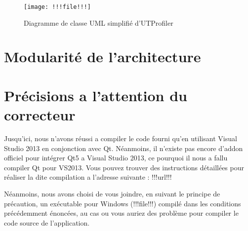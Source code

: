 \documentclass[a4paper,11pt]{article}
\begin{document}
\begin{a3_landscape}
\begin{figure}[!h]
	\begin{center}
		\texttt{[image: !!!file!!!]}
		\caption{Diagramme de classe UML simplifié d'UTProfiler}
	\end{center}
\end{figure}
\end{a3_landscape}

\section{Modularité de l'architecture}

\newpage
\section{Précisions a l'attention du correcteur}
Jusqu'ici, nous n'avons réussi a compiler le code fourni qu'en utilisant Visual Studio 2013 en conjonction avec Qt. Néanmoins, il n'existe pas encore d'addon officiel pour intégrer Qt5 a Visual Studio 2013, ce pourquoi il nous a fallu compiler Qt pour VS2013. Vous pouvez trouver des instructions détaillées pour réaliser la dite compilation a l'adresse suivante : !!!url!!!

Néanmoins, nous avons choisi de vous joindre, en suivant le principe de précaution, un exécutable pour Windows (!!!file!!!) compilé dans les conditions précédemment énoncées, au cas ou vous auriez des problème pour compiler le code source de l'application.
\end{document}
